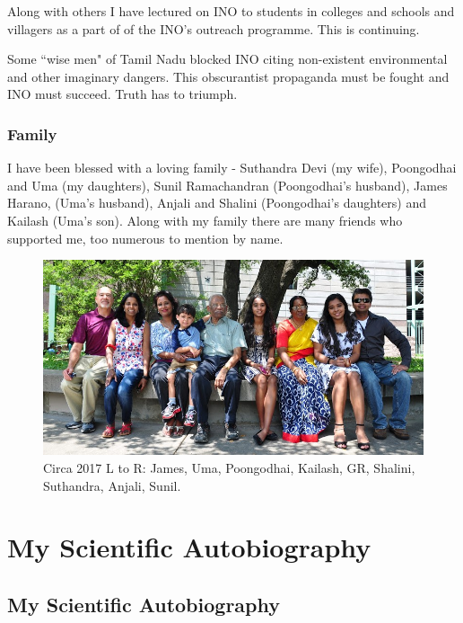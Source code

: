 Along with others I have lectured on INO to students in colleges and 
schools and villagers as a part of of the INO's outreach programme. This 
is continuing.
  
Some ``wise men" of Tamil Nadu blocked INO citing non-existent 
environmental and other imaginary dangers. This obscurantist propaganda 
must be fought and INO must succeed. Truth has to triumph.


\section*{Family}

I have been blessed with a loving family - Suthandra Devi (my wife), 
Poongodhai and Uma (my daughters), Sunil Ramachandran (Poongodhai's 
husband), James Harano, (Uma's husband), Anjali and Shalini 
(Poongodhai's daughters) and Kailash (Uma's son).
Along with my family there are many friends who supported me, too 
numerous to mention by name.

\begin{figure}[h]
\centering
\includegraphics[width=1.1\textwidth]{images/Rajaji-family-1.jpg}
\caption{Circa 2017 L to R: James, Uma, Poongodhai, Kailash, GR,
Shalini, Suthandra, Anjali, Sunil.}
\end{figure}


\part{My Scientific Autobiography}

\setcounter{chapter}{0}
\chapter{My Scientific Autobiography}


